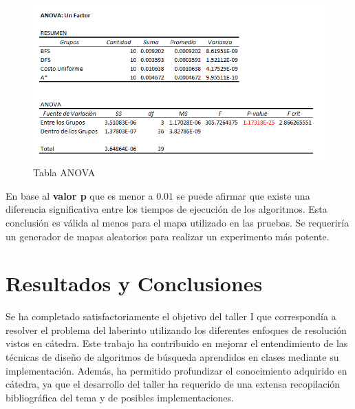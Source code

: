 \documentclass[letter, titlepage, 10pt]{article}
\begin{document}
\begin{figure}[H]
    \begin{center}
        \includegraphics[scale = 0.5]{images/ANOVA}
        \caption{Tabla ANOVA}
    \end{center}
\end{figure}

En base al \textbf{valor p} que es menor a $0.01$ se puede afirmar que existe una diferencia significativa entre los tiempos de ejecución de los algoritmos. Esta conclusión es válida al menos para el mapa utilizado en las pruebas. Se requeriría un generador de mapas aleatorios para realizar un experimento más potente.

\newpage
\section{Resultados y Conclusiones}
Se ha completado satisfactoriamente el objetivo del taller I que correspondía a resolver el problema del laberinto utilizando los diferentes enfoques de resolución vistos en cátedra. Este trabajo ha contribuido en mejorar el entendimiento de las técnicas de diseño de algoritmos de búsqueda aprendidos en clases mediante su implementación. Además, ha permitido profundizar el conocimiento adquirido en cátedra, ya que el desarrollo del taller ha requerido de una extensa recopilación bibliográfica del tema y de posibles implementaciones.
\end{document}
